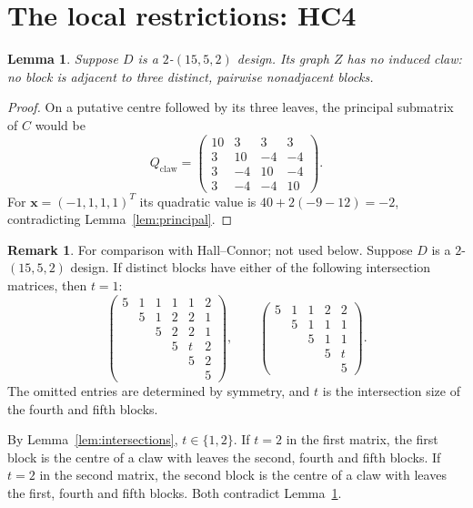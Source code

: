 \documentclass[11pt]{article}
\newcommand\Zx{{\mathbf x}}
\newcommand\pmat[1]{\begin{pmatrix} #1 \end{pmatrix}}
\newtheorem{lemma}[theorem]{Lemma}
\theoremstyle{definition}
\newtheorem{remark}[theorem]{Remark}
\begin{document}
\section{The local restrictions: HC4}

\begin{lemma}\label{lem:claw}
Suppose $D$ is a $2$-$(15,5,2)$ design. Its graph $Z$ has no induced
claw: no block is adjacent to three distinct, pairwise nonadjacent
blocks.
\end{lemma}
\begin{proof}
On a putative centre followed by its three leaves, the principal
submatrix of $C$ would be
\[
 Q_{\mathrm{claw}}=
 \begin{pmatrix}
 10&3&3&3\\3&10&-4&-4\\3&-4&10&-4\\3&-4&-4&10
 \end{pmatrix}.
\]
For $\Zx=(-1,1,1,1)^T$ its quadratic value is
$40+2(-9-12)=-2$, contradicting Lemma~\ref{lem:principal}.
\end{proof}

\begin{remark}\label{rem:source-local}
\cite[Lemmas 4.3 and 4.4, at $k=5$]{HC}
For comparison with Hall--Connor; not used below.
Suppose $D$ is a $2$-$(15,5,2)$ design. If distinct blocks have either
of the following intersection matrices, then $t=1$:
\[
 \pmat{5&1&1&1&1&2\\&5&1&2&2&1\\&&5&2&2&1\\
 &&&5&t&2\\&&&&5&2\\&&&&&5},\qquad
 \pmat{5&1&1&2&2\\&5&1&1&1\\&&5&1&1\\&&&5&t\\&&&&5}.
\]
The omitted entries are determined by symmetry, and $t$ is the
intersection size of the fourth and fifth blocks.

By Lemma~\ref{lem:intersections}, $t\in\{1,2\}$. If $t=2$ in the
first matrix, the first block is the centre of a claw with leaves the
second, fourth and fifth blocks. If $t=2$ in the second matrix, the
second block is the centre of a claw with leaves the first, fourth and
fifth blocks. Both contradict Lemma~\ref{lem:claw}.
\end{remark}
\end{document}
